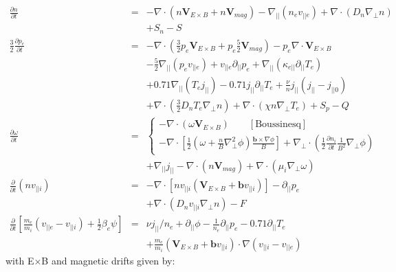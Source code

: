 \documentclass[12pt,a4paper]{article}
\newcommand{\deriv}[2]{\frac{\partial #1}{\partial #2}}
\begin{document}
\begin{eqnarray}
  \deriv{n}{t} &=& -\nabla\cdot\left(n\mathbf{V}_{E\times B} + n\mathbf{V}_{mag}\right) - \nabla_{||}\left(n_e v_{||e}\right) + \nabla\cdot\left(D_n\nabla_\perp n\right) \nonumber \\
  && + S_n - S \\
  \frac{3}{2}\deriv{p_e}{t} &=& -\nabla\cdot\left(\frac{3}{2}p_e\mathbf{V}_{E\times B} + p_e\frac{5}{2}\mathbf{V}_{mag}\right) - p_e\nabla\cdot\mathbf{V}_{E\times B} \nonumber \\
  && - \frac{5}{2}\nabla_{||}\left(p_e v_{||e}\right) + v_{||e}\partial_{||}p_e  + \nabla_{||}\left(\kappa_{e||}\partial_{||}T_e\right) \nonumber \\
  && + 0.71\nabla_{||}\left(T_e j_{||}\right) - 0.71 j_{||}\partial_{||} T_e + \frac{\nu}{n}j_{||}\left(j_{||} - j_{||0}\right)\nonumber \\
  &&+ \nabla\cdot \left(\frac{3}{2}D_nT_e\nabla_\perp n\right) + \nabla\cdot\left(\chi n\nabla_\perp T_e\right) + S_p - Q\\
  \deriv{\omega}{t} &=& \left\{\begin{array}{l}
  -\nabla\cdot\left(\omega\mathbf{V}_{E\times B}\right) \qquad \mathrm{[Boussinesq]} \\
  -\nabla\cdot\left[\frac{1}{2}\left(\omega + \frac{n}{B}\nabla_\perp^2\phi\right)\frac{\mathbf{b}\times\nabla\phi}{B}\right] + \nabla_\perp\cdot\left(\frac{1}{2}\frac{\partial n_i}{\partial t}\frac{1}{B^2}\nabla_\perp\phi\right) \end{array}\right. \nonumber \\
  &&+ \nabla_{||}j_{||} - \nabla\cdot\left(n \mathbf{V}_{mag}\right)  + \nabla\cdot\left(\mu_i\nabla_\perp\omega\right)  \\
  \frac{\partial}{\partial t}\left(nv_{||i}\right) &=& -\nabla\cdot\left[nv_{||i}\left(\mathbf{V}_{E\times B}+ \mathbf{b}v_{||i}\right)\right] - \partial_{||}p_e \nonumber\\
  && + \nabla\cdot \left(D_nv_{||i}\nabla_\perp n\right) - F \\
  \frac{\partial}{\partial t}\left[\frac{m_e}{m_i}\left(v_{||e}-v_{||i}\right) + \frac{1}{2}\beta_e\psi\right] &=& \nu j_{||}/n_e + \partial_{||}\phi - \frac{1}{n_e}\partial_{||} p_e - 0.71\partial_{||} T_e \label{eq:ohmslaw} \\
  &&+ \frac{m_e}{m_i}\left(\mathbf{V}_{E\times B} + \mathbf{b}v_{||i}\right)\cdot\nabla\left(v_{||i} - v_{||e}\right)
\end{eqnarray}
with E$\times$B and magnetic drifts given by:
\end{document}
